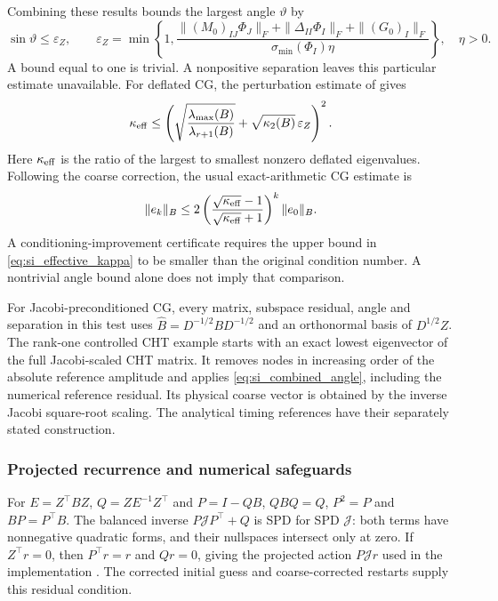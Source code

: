 Combining these results bounds the largest angle $\vartheta$ by
\begin{equation}\label{eq:si_combined_angle}
 \sin\vartheta\leq\varepsilon_Z,\qquad
 \varepsilon_Z=\min\left\{1,
 \frac{\|(M_0)_{IJ}\Phi_J\|_F+
       \|\Delta_{II}\Phi_I\|_F+\|(G_0)_I\|_F}
      {\sigma_{\min}(\Phi_I)\eta}\right\},
 \quad \eta>0.
\end{equation}
A bound equal to one is trivial. A nonpositive separation leaves
this particular estimate unavailable.
For deflated CG, the perturbation estimate of
\citet{kahl2017deflated} gives
\begin{equation}\label{eq:si_effective_kappa}
 \kappa_{\rm eff}\leq
 \left(\sqrt{\frac{\lambda_{\max}(B)}{\lambda_{r+1}(B)}}+
       \sqrt{\kappa_2(B)}\,\varepsilon_Z\right)^2.
\end{equation}
Here $\kappa_{\rm eff}$ is the ratio of the largest to smallest
nonzero deflated eigenvalues. Following the coarse correction,
the usual exact-arithmetic CG estimate is
\[
 \|e_k\|_B\leq2
 \left(\frac{\sqrt{\kappa_{\rm eff}}-1}
            {\sqrt{\kappa_{\rm eff}}+1}\right)^k\|e_0\|_B.
\]
A conditioning-improvement certificate requires the upper bound
in \eqref{eq:si_effective_kappa} to be smaller than the original
condition number. A nontrivial angle bound alone does not imply
that comparison.

For Jacobi-preconditioned CG, every matrix, subspace residual,
angle and separation in this test uses
$\widehat B=D^{-1/2}BD^{-1/2}$ and an orthonormal basis of
$D^{1/2}Z$. The rank-one controlled CHT example starts with an
exact lowest eigenvector of the full Jacobi-scaled CHT matrix.
It removes nodes in increasing order of the absolute reference
amplitude and applies \eqref{eq:si_combined_angle}, including
the numerical reference residual. Its physical coarse vector is
obtained by the inverse Jacobi square-root scaling. The analytical
timing references have their separately stated construction.

\subsubsection{Projected recurrence and numerical safeguards}
\label{si:implementation}
For $E=Z^\top BZ$, $Q=ZE^{-1}Z^\top$ and $P=I-QB$,
$QBQ=Q$, $P^2=P$ and $BP=P^\top B$.
The balanced inverse $P\mathcal JP^\top+Q$ is SPD for SPD $\mathcal J$:
both terms have nonnegative quadratic forms, and their nullspaces
intersect only at zero. If $Z^\top r=0$, then $P^\top r=r$ and
$Qr=0$, giving the projected action $P\mathcal Jr$ used in the implementation
\citep{tang2009comparison,gaul2014framework}.
The corrected initial guess and coarse-corrected restarts supply
this residual condition.


